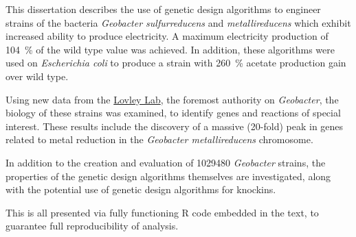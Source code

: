 This dissertation describes the use of genetic design algorithms to engineer strains of the bacteria \textit{Geobacter sulfurreducens} and \textit{metallireducens} which exhibit increased ability to produce electricity. 
A maximum electricity production of \SI{104}{\percent} of the wild type value was achieved.
In addition, these algorithms were used on \textit{Escherichia coli} to produce a strain with \SI{260}{\percent} acetate production gain over wild type.

Using new data from the \href{http://www.geobacter.org/}{Lovley Lab}, the foremost authority on \textit{Geobacter}, the biology of these strains was examined, to identify genes and reactions of special interest. These results include the discovery of a massive (20-fold) peak in genes related to metal reduction in the \textit{Geobacter metallireducens} chromosome.

In addition to the creation and evaluation of \num{1029480} \textit{Geobacter} strains, the properties of the genetic design algorithms themselves are investigated, along with the potential use of genetic design algorithms for knockins.

This is all presented via fully functioning R code embedded in the text, to guarantee full reproducibility of analysis. 
